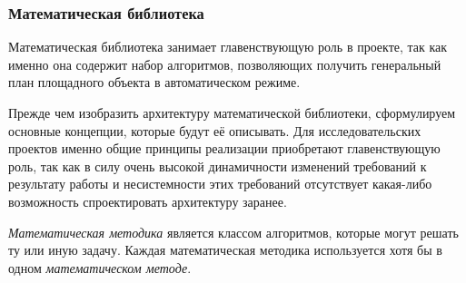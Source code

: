 \subsubsection{\large{Математическая библиотека}}

Математическая библиотека занимает главенствующую роль в проекте, так как именно она содержит
набор алгоритмов, позволяющих получить генеральный план площадного объекта в автоматическом режиме.

Прежде чем изобразить архитектуру математической библиотеки, сформулируем основные концепции,
которые будут её описывать.
Для исследовательских проектов именно общие принципы реализации
приобретают главенствующую роль, так как в силу очень высокой динамичности изменений требований к результату работы
и несистемности этих требований отсутствует какая-либо возможность спроектировать архитектуру заранее.

\textit{Математическая методика} является классом алгоритмов, которые могут решать ту или иную задачу.
Каждая математическая методика используется хотя бы в одном \textit{математическом методе}.

